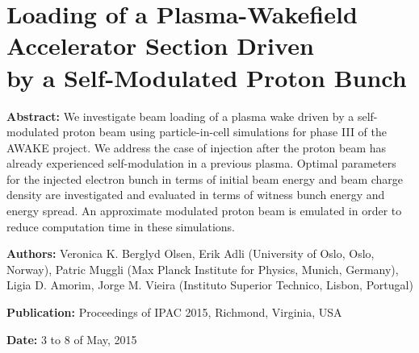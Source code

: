 %
%

\chapter[Loading of a Plasma-Wakefield Accelerator Section Driven by a Self-Modulated\\Proton Bunch, \emph{Proceedings of IPAC 2015}]%
        {Loading of a Plasma-Wakefield Accelerator Section Driven\\by a Self-Modulated Proton Bunch}
\label{Pub:IPAC15}

\begin{hangparas}{10mm}{1}

    \textbf{Abstract:}
    We investigate beam loading of a plasma wake driven by a self-modulated proton beam using particle-in-cell
    simulations for phase III of the AWAKE project. We address the case of injection after the proton beam has already
    experienced self-modulation in a previous plasma. Optimal parameters for the injected electron bunch in terms of
    initial beam energy and beam charge density are investigated and evaluated in terms of witness bunch energy and
    energy spread. An approximate modulated proton beam is emulated in order to reduce computation time in these
    simulations.

    \vspace{8mm}

    \textbf{Authors:}
    Veronica K. Berglyd Olsen, Erik Adli (University of Oslo, Oslo, Norway),
    Patric Muggli (Max Planck Institute for Physics, Munich, Germany),
    Ligia D. Amorim, Jorge M. Vieira (Instituto Superior Technico, Lisbon, Portugal)

    \vspace{5mm}

    \textbf{Publication:}
    Proceedings of IPAC 2015, Richmond, Virginia, USA  \cite{berglyd_olsen:2015}

    \vspace{5mm}

    \textbf{Date:} 3 to 8 of May, 2015

\end{hangparas}
